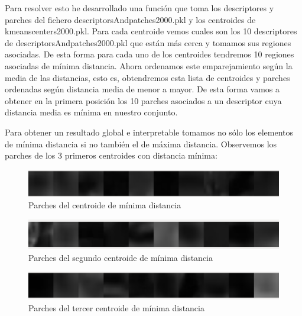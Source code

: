 \documentclass[12pt,a4paper]{article}
\begin{document}
Para resolver esto he desarrollado una función que toma los descriptores y parches del fichero descriptorsAndpatches2000.pkl y los centroides de kmeanscenters2000.pkl. Para cada centroide vemos cuales son los 10 descriptores de descriptorsAndpatches2000.pkl que están más cerca y tomamos sus regiones asociadas. De esta forma para cada uno de los centroides tendremos 10 regiones asociadas de mínima distancia. Ahora ordenamos este emparejamiento según la media de las distancias, esto es, obtendremos esta lista de centroides y parches ordenadas según distancia media de menor a mayor. De esta forma vamos a obtener en la primera posición los 10 parches asociados a un descriptor cuya distancia media es mínima en nuestro conjunto.

\vspace{10px}

Para obtener un resultado global e interpretable tomamos no sólo los elementos de mínima distancia si no también el de máxima distancia. Observemos los parches de los 3 primeros centroides con distancia mínima:

\begin{figure}[H]
  \centering
  \includegraphics[scale=1.1]{./Imagenes/Ejercicio3-1.png}
  \caption{Parches del centroide de mínima distancia}
	\label{Ejercicio3-1}
\end{figure}

\begin{figure}[H]
  \centering
  \includegraphics[scale=1.1]{./Imagenes/Ejercicio3-2.png}
  \caption{Parches del segundo centroide de mínima distancia}
	\label{Ejercicio3-2}
\end{figure}

\begin{figure}[H]
  \centering
  \includegraphics[scale=1.1]{./Imagenes/Ejercicio3-3.png}
  \caption{Parches del tercer centroide de mínima distancia}
	\label{Ejercicio3-3}
\end{figure}
\end{document}
